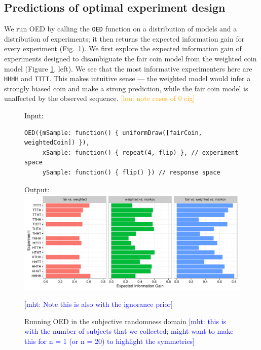 \documentclass{article}
\newcommand{\mht}[1]{\textcolor{Blue}{[mht: #1]}}
\newcommand{\lou}[1]{\textcolor{orange}{[lou: #1]}}
\begin{document}
\subsection{Predictions of optimal experiment design}

We run OED by calling the \lstinline{OED} function on a distribution of models and a distribution of experiments; it then returns the expected information gain for every experiment (Fig.~\ref{fig:run-coin}).
We first explore the expected information gain of experiments designed to disambiguate the fair coin model from the weighted coin model (Figure \ref{fig:run-coin}, left).
We see that the most informative experimenters here are \lstinline{HHHH} and \lstinline{TTTT}.
This makes intuitive sense --- the weighted model would infer a strongly biased coin and make a strong prediction, while the fair coin model is unaffected by the observed sequence.
\lou{note cases of 0 eig}

\begin{figure}[h]
\underline{\textsf{Input:}}
\begin{lstlisting}
OED({mSample: function() { uniformDraw([fairCoin, weightedCoin]) }),
     xSample: function() { repeat(4, flip) }, // experiment space
     ySample: function() { flip() }) // response space
\end{lstlisting}

\underline{\textsf{Output:}}\\
\includegraphics[width=\columnwidth]{img/coin_eig.pdf}
\caption{Running OED in the subjective randomness domain \mht{this is with the number of subjects that we collected; might want to make this for n = 1 (or n = 20) to highlight the symmetries}} \mht{Note this is also with the ignorance prior}
\label{fig:run-coin}
\end{figure}
\end{document}
